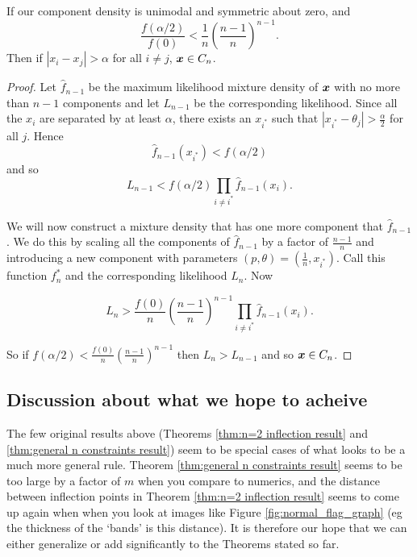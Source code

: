 		\begin{theorem}
			If our component density is unimodal and symmetric about zero, and
			$$\frac{f(\alpha/2)}{f(0)} < \frac{1}{n}\left(\frac{n-1}{n}\right)^{n-1}.$$
			Then if $|x_i - x_j| > \alpha$ for all $i\neq j$, ${\bm{{x}}} \in C_n$.
		\end{theorem}
		\begin{proof}
			Let $\hat{f}_{n-1}$ be the maximum likelihood mixture density of ${\bm{{x}}}$ with no more than $n-1$ components and let $L_{n-1}$ be the corresponding likelihood. Since all the $x_i$ are separated by at least $\alpha$, there exists an $x_{i^*}$ such that $|x_{i^*} - \theta_j|>\frac{\alpha}{2}$ for all $j$. Hence
			$$\hat{f}_{n-1}(x_{i^*}) < f(\alpha/2)$$
			and so
			$$L_{n-1} < f(\alpha/2) \prod_{i\neq i^*} \hat{f}_{n-1}(x_{i}).$$
			
			We will now construct a mixture density that has one more component that $\hat{f}_{n-1}$. We do this by scaling all the components of $\hat{f}_{n-1}$ by a factor of $\frac{n-1}{n}$ and introducing a new component with parameters $(p,\theta) = (\frac{1}{n},x_{i^*})$. Call this function $f^*_n$ and the corresponding likelihood $L_n$. Now
			
			$$L_n > \frac{f(0)}{n} \left(\frac{n-1}{n}\right)^{n-1}\prod_{i\neq i^*} \hat{f}_{n-1}(x_i).$$
			
			So if $f(\alpha/2) < \frac{f(0)}{n} \left(\frac{n-1}{n}\right)^{n-1}$ then $L_n > L_{n-1}$ and so ${\bm{{x}}} \in C_n$.
		\end{proof}

	\subsection{Discussion about what we hope to acheive}
		The few original results above (Theorems \ref{thm:n=2 inflection result} and \ref{thm:general n constraints result}) seem to be special cases of what looks to be a much more general rule. Theorem \ref{thm:general n constraints result} seems to be too large by a factor of $m$ when you compare to numerics, and the distance between inflection points in Theorem \ref{thm:n=2 inflection result} seems to come up again when when you look at images like Figure \ref{fig:normal_flag_graph} (eg the thickness of the `bands' is this distance). It is therefore our hope that we can either generalize or add significantly to the Theorems stated so far.